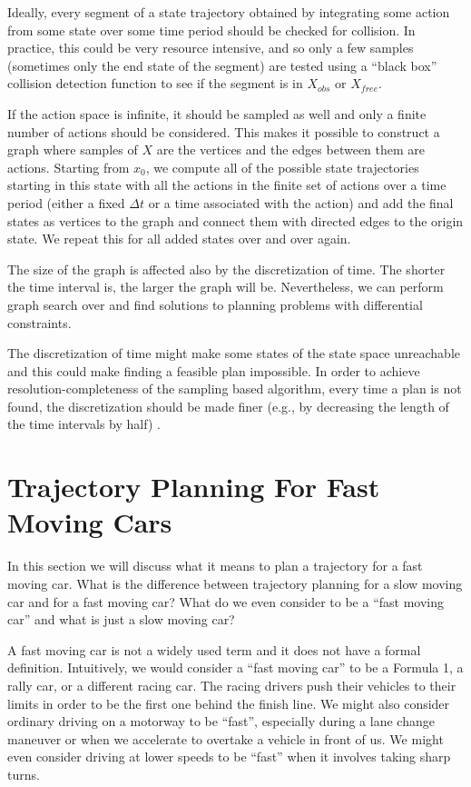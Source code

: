 Ideally, every segment of a state trajectory obtained by integrating some action from some state over some time period should be checked for collision. In practice, this could be very resource intensive, and so only a few samples (sometimes only the end state of the segment) are tested using a ``black box'' collision detection function to see if the segment is in $X_{obs}$ or $X_{free}$.

If the action space is infinite, it should be sampled as well and only a finite number of actions should be considered. This makes it possible to construct a graph where samples of $X$ are the vertices and the edges between them are actions. Starting from $x_0$, we compute all of the possible state trajectories starting in this state with all the actions in the finite set of actions over a time period (either a fixed $\Delta t$ or a time associated with the action) and add the final states as vertices to the graph and connect them with directed edges to the origin state. We repeat this for all added states over and over again.

The size of the graph is affected also by the discretization of time. The shorter the time interval is, the larger the graph will be. Nevertheless, we can perform graph search over and find solutions to planning problems with differential constraints.

The discretization of time might make some states of the state space unreachable and this could make finding a feasible plan impossible. In order to achieve resolution-completeness of the sampling based algorithm, every time a plan is not found, the discretization should be made finer (e.g., by decreasing the length of the time intervals by half) \cite[Chapter~14.2]{lavalle_2006}.

\section{Trajectory Planning For Fast Moving Cars}

In this section we will discuss what it means to plan a trajectory for a fast moving car. What is the difference between trajectory planning for a slow moving car and for a fast moving car? What do we even consider to be a ``fast moving car'' and what is just a slow moving car?

A fast moving car is not a widely used term and it does not have a formal definition. Intuitively, we would consider a ``fast moving car'' to be a Formula 1, a rally car, or a different racing car. The racing drivers push their vehicles to their limits in order to be the first one behind the finish line. We might also consider ordinary driving on a motorway to be ``fast'', especially during a lane change maneuver or when we accelerate to overtake a vehicle in front of us. We might even consider driving at lower speeds to be ``fast'' when it involves taking sharp turns.

